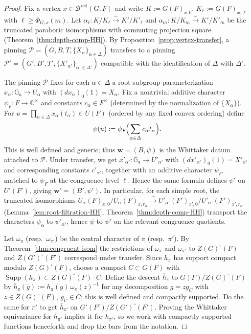 \documentclass[10pt,a4paper]{amsart}
\newcommand{\C}{\mathbb{C}}
\DeclareMathOperator{\Supp}{Supp}
\begin{document}
\begin{proof}

Fix a vertex \(x\in\mathcal{B}^{\mathrm{red}}(G,F)\) and write
\(K:=G(F)_{x,0}\), \(K_\ell:=G(F)_{x,\ell}\) with
\(\ell\ge \Phi_{G,x}(m)\). Let \(\alpha_\ell:K/K_\ell\xrightarrow{\sim}K'/K'_\ell\) and
\(\alpha_m:K/K_m\xrightarrow{\sim}K'/K'_m\) be the truncated parahoric
isomorphisms with commuting projection square (Theorem~\ref{thm:depth-comp-HH}).
By Proposition~\ref{prop:vertex-transfer}, a pinning
\(\mathcal P=(G,B,T,\{X_\alpha\}_{\alpha\in\Delta})\) transfers to a pinning
\(\mathcal P'=(G',B',T',\{X'_{\alpha'}\}_{\alpha'\in\Delta'})\) compatible with
the identification of \(\Delta\) with \(\Delta'\).

\smallskip

The pinning \(\mathcal P\) fixes for each \(\alpha\in\Delta\) a root subgroup
parameterization \(x_\alpha:\mathbb{G}_a\!\to U_\alpha\) with
\((dx_\alpha)_0(1)=X_\alpha\). Fix a nontrivial additive character
\(\psi_F:F\to\C^\times\) and constants \(c_\alpha\in F^\times\) (determined by the normalization of \(\{X_\alpha\}\)).
For \(u=\prod_{\alpha\in\Delta}x_\alpha(t_\alpha)\in U(F)\) (ordered by any
fixed convex ordering) define
\[
\psi(u):=\psi_F\!\Bigl(\sum_{\alpha\in\Delta} c_\alpha t_\alpha\Bigr).
\]
This is well defined and generic; thus \(\mathbf w=(B,\psi)\) is the
Whittaker datum attached to \(\mathcal P\). Under transfer,
we get \(x'_{\alpha'}:\mathbb{G}_a\!\to U'_{\alpha'}\) with
\((dx'_{\alpha'})_0(1)=X'_{\alpha'}\) and corresponding constants \(c'_{\alpha'}\),
together with an additive character \(\psi_{F'}\) matched to
\(\psi_F\) at the congruence level \(\ell\). Hence the same formula defines
\(\psi'\) on \(U'(F')\), giving \(\mathbf w'=(B',\psi')\).
In particular, for each simple root, the truncated isomorphisms
\(U_\alpha(F)_{x,0}/U_\alpha(F)_{x,r_\alpha}\!\xrightarrow{\sim}\!
U'_{\alpha'}(F')_{x',0}/U'_{\alpha'}(F')_{x',r_\alpha}\)
(Lemma~\ref{lem:root-filtration-HH}, Theorem~\ref{thm:depth-comp-HH})
transport the characters \(\psi_\alpha\) to \(\psi'_{\alpha'}\), hence \(\psi\) to \(\psi'\) on the relevant congruence quotients.

\smallskip

Let \(\omega_\pi\) (resp.\ \(\omega_{\pi'}\)) be the central character of \(\pi\)
(resp.\ \(\pi'\)). By Theorem~\ref{thm:congruent-isom} the restrictions of
\(\omega_\pi\) and \(\omega_{\pi'}\) to \(Z(G)^\circ(F)\) and
\(Z(G')^\circ(F')\) correspond under transfer. Since \(h_\pi\) has support
compact modulo \(Z(G)^\circ(F)\), choose a compact \(C\subset G(F)\) with
\(\Supp(h_\pi)\subset Z(G)^\circ(F)\!\cdot C\).
Define the descent \(\overline h_\pi\) to \(G(F)/Z(G)^\circ(F)\) by
\(\overline h_\pi(\overline g):=h_\pi(g)\,\omega_\pi(z)^{-1}\) for any
decomposition \(g=zg_C\) with \(z\in Z(G)^\circ(F)\), \(g_C\in C\);
this is well defined and compactly supported. Do the same for \(\pi'\) to get
\(\overline h_{\pi'}\) on \(G'(F')/Z(G')^\circ(F')\). Proving the Whittaker
equivariance for \(\overline h_{\pi'}\) implies it for \(h_{\pi'}\), so we work
with compactly supported functions henceforth and drop the bars from the
notation.


\end{proof}
\end{document}
